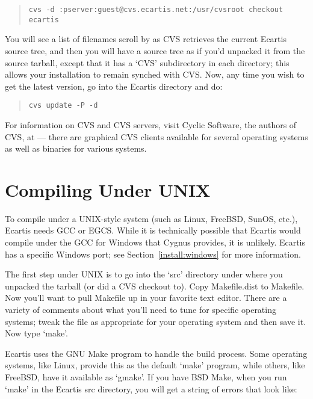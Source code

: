 \documentclass{book}
\begin{document}
\begin{quote}
\footnotesize
\begin{verbatim}
cvs -d :pserver:guest@cvs.ecartis.net:/usr/cvsroot checkout ecartis
\end{verbatim}
\end{quote}
   
You will see a list of filenames scroll by as CVS retrieves the current Ecartis
source tree, and then you will have a source tree as if you'd unpacked it from
the source tarball, except that it has a `CVS' subdirectory in each directory;
this allows your installation to remain synched with CVS.  Now, any time you
wish to get the latest version, go into the Ecartis directory and do:
   
\begin{quote}
\footnotesize
\begin{verbatim}
cvs update -P -d
\end{verbatim}
\end{quote}

For information on CVS and CVS servers, visit Cyclic Software, the authors of
CVS, at  --- there are graphical CVS clients
available for several operating systems as well as binaries for various
systems.
   
\section{Compiling Under UNIX}
\label{install:unix}

To compile under a UNIX-style system (such as Linux, FreeBSD, SunOS, etc.),
Ecartis needs GCC or EGCS.  While it is technically possible that Ecartis would
compile under the GCC for Windows that Cygnus provides, it is unlikely.
Ecartis has a specific Windows port; see Section~\ref{install:windows} for more
information.

The first step under UNIX is to go into the `src' directory under where you
unpacked the tarball (or did a CVS checkout to).  Copy Makefile.dist to
Makefile.  Now you'll want to pull Makefile up in your favorite text editor.
There are a variety of comments about what you'll need to tune for specific
operating systems; tweak the file as appropriate for your operating system and
then save it.  Now type `make'.
   
Ecartis uses the GNU Make program to handle the build process.  Some operating
systems, like Linux, provide this as the default `make' program, while others,
like FreeBSD, have it available as `gmake'.  If you have BSD Make, when you
run `make' in the Ecartis src directory, you will get a string of errors that
look like:
\end{document}
